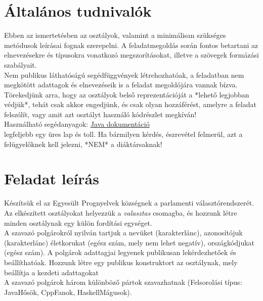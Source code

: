 \documentclass[12pt,a4paper]{article}
\begin{document}
\section{Általános tudnivalók}

Ebben az ismertetésben az osztályok, valamint a minimálisan szükséges
metódusok leírásai fognak szerepelni.  A feladatmegoldás során fontos
betartani az elnevezésekre és típusokra vonatkozó megszorításokat, illetve
a szövegek formázási szabályait. \\

Nem publikus láthatóságú segédfüggvények létrehozhatóak, a feladatban nem
megkötött adattagok és elnevezéseik is a feladat megoldójára vannak bízva.
Törekedjünk arra, hogy az osztályok belső reprezentációját a *lehető
legjobban védjük*, tehát csak akkor engedjünk, és csak olyan hozzáférést,
amelyre a feladat felszólít, vagy amit azt osztályt használó kódrészlet
megkíván! \\ 

Használható segédanyagok:
\href{https://bead.inf.elte.hu/files/java/api/index.html}{Java dokumentáció} \\
legfeljebb egy üres lap és toll.  Ha bármilyen kérdés, észrevétel felmerül,
azt a felügyelőknek kell jelezni, *NEM* a diáktársaknak!


\section{Feladat leírás}

Készítsük el az Egyesült Prognyelvek községnek a parlamenti választórendszerét. 
Az elkészített osztályokat helyezzük a \textit{valasztas} csomagba, és hozzunk 
létre minden osztálynak egy külön fordítási egységet. \\
 
A szavazó polgárokról nyilván tartjuk a nevüket (karakterlánc), 
azonosítójuk (karakterlánc) életkorukat (egész szám, mely nem lehet negatív), 
országkódjukat (egész szám). A polgárok adattagjai legyenek publikusan 
lekérdezhetőek és beállíthatóak. Hozzunk létre egy publikus konstruktort az 
osztálynak, mely beállítja a kezdeti adattagokat \\ 
A szavazó polgárok három különböző pártok szavazhatnak 
(Felsorolási típus: JavaHősök, CppFanok, HaskellMágusok). \\
\end{document}
